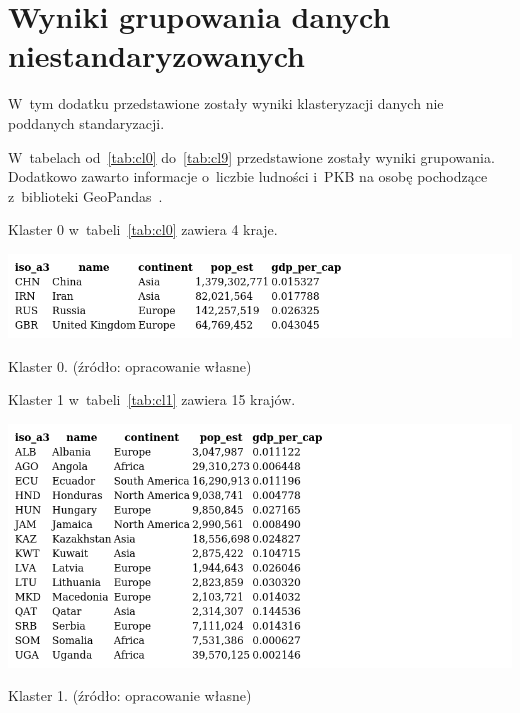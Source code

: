 \documentclass[11pt]{report}
\begin{document}
    \chapter{Wyniki grupowania danych niestandaryzowanych}\label{ch:dodatek_niestd}
    W~tym dodatku przedstawione zostały wyniki klasteryzacji danych nie poddanych standaryzacji.

    W~tabelach od~\ref{tab:cl0} do~\ref{tab:cl9} przedstawione zostały wyniki grupowania.
    Dodatkowo zawarto informacje o~liczbie ludności i~PKB na osobę pochodzące z~biblioteki GeoPandas~\cite{geopandas}.

    Klaster 0 w~tabeli~\ref{tab:cl0} zawiera 4 kraje.
    \begin{table}[!htp]
        \centering
        \includegraphics[width=\linewidth]{tables/CLUST/clust0kmeans.png}
        \caption{Klaster 0. (źródło: opracowanie własne)}
        \label{tab:cl0}
    \end{table}

    Klaster 1 w~tabeli~\ref{tab:cl1} zawiera 15 krajów.
    \begin{table}[!htp]
        \centering
        \includegraphics[width=\linewidth]{tables/CLUST/clust1kmeans.png}
        \caption{Klaster 1. (źródło: opracowanie własne)}
        \label{tab:cl1}
    \end{table}
\end{document}
